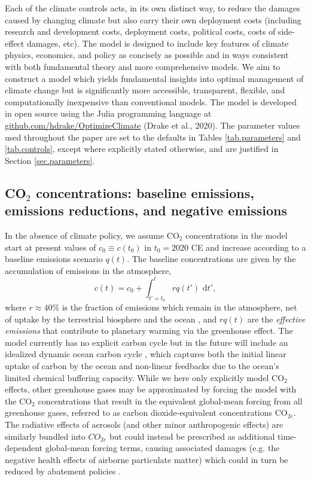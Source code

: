 \documentclass{article}
\begin{document}
Each of the climate controls acts, in its own distinct way, to reduce the damages caused by  changing climate but also carry their own deployment costs (including research and development costs, deployment costs, political costs, costs of side-effect damages, etc). The model is designed to include key features of climate physics, economics, and policy as concisely as possible and in ways consistent with both fundamental theory and more comprehensive models. We aim to construct a model which yields fundamental insights into optimal management of climate change but is significantly more accessible, transparent, flexible, and computationally inexpensive than conventional models. The model is developed in open source using the Julia programming language \citep{bezanson_julia:_2017} at \href{github.com/hdrake/OptimizeClimate}{github.com/hdrake/OptimizeClimate} (Drake et al., 2020). The parameter values used throughout the paper are set to the defaults in Tables \ref{tab.parameters} and \ref{tab.controls}, except where explicitly stated otherwise, and are justified in Section \ref{sec.parameters}.

\subsection{CO$_{2}$ concentrations: baseline emissions, emissions reductions, and negative emissions}

In the absence of climate policy, we assume CO$_{2}$ concentrations in the model start at present values of $c_{0} \equiv c(t_{0})$ in $t_{0}=2020$ CE and increase according to a baseline emissions scenario $q(t)$. The baseline concentrations are given by the accumulation of emissions in the atmosphere,
\begin{equation}
c(t) = c_{0} + \int_{t'=t_{0}}^{t} rq(t') \text{ d}t',
\end{equation}
where $r \approx 40\%$ is the fraction of emissions which remain in the atmosphere, net of uptake by the terrestrial biosphere and the ocean \citep{solomon_irreversible_2009}, and $rq(t)$ are the \textit{effective emissions} that contribute to planetary warming via the greenhouse effect. The model currently has no explicit carbon cycle but in the future will include an idealized dynamic ocean carbon cycle \citep{glotter_simple_2014}, which captures both the initial linear uptake of carbon by the ocean and non-linear feedbacks due to the ocean's limited chemical buffering capacity. While we here only explicitly model CO$_{2}$ effects, other greenhouse gases may be approximated by forcing the model with the CO$_{2}$ concentrations that result in the equivalent global-mean forcing from all greenhouse gases, referred to as carbon dioxide-equivalent concentrations CO$_{2e}$. The radiative effects of aerosols (and other minor anthropogenic effects) are similarly bundled into $CO_{2e}$ but could instead be prescribed as additional time-dependent global-mean forcing terms, causing associated damages (e.g. the negative health effects of airborne particulate matter) which could in turn be reduced by abatement policies \citep{thompson_systems_2014}.
\end{document}

